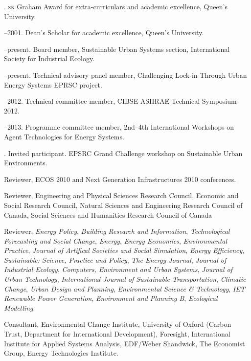 \documentclass[11pt,a4paper]{article}
\begin{document}
.  \textsc{sn} Graham Award for extra-curriculars and academic excellence, Queen's University.

--2001.  Dean's Scholar for academic excellence, Queen's University.

\bigskip 

\noindent{}%
%
--present. Board member, Sustainable Urban Systems section, International Society for Industrial Ecology.

--present. Technical advisory panel member, Challenging Lock-in Through Urban Energy Systems EPRSC project.

--2012. Technical committee member, CIBSE ASHRAE Technical Symposium 2012.

--2013. Programme committee member, 2nd--4th International Workshops on Agent Technologies for Energy Systems.

. Invited participant.  EPSRC Grand Challenge workshop on Sustainable Urban Environments.

\ind Reviewer, ECOS 2010 and Next Generation Infrastructures 2010 conferences.

\ind Reviewer, Engineering and Physical Sciences Research Council, Economic and Social Research Council, Natural Sciences and Engineering Research Council of Canada, Social Sciences and Humanities Research Council of Canada

\ind Reviewer, \emph{Energy Policy}, \emph{Building Research and Information}, \emph{Technological Forecasting and Social Change}, \emph{Energy}, \emph{Energy Economics}, \emph{Environmental Practice}, \emph{Journal of Artifical Societies and Social Simulation}, \emph{Energy Efficiency}, \emph{Sustainable: Science, Practice and Policy}, \emph{The Energy Journal}, \emph{Journal of Industrial Ecology}, \emph{Computers, Environment and Urban Systems}, \emph{Journal of Urban Technology}, \emph{International Journal of Sustainable Transportation}, \emph{Climatic Change}, \emph{Urban Design and Planning}, \emph{Environmental Science \& Technology}, \emph{IET Renewable Power Generation}, \emph{Environment and Planning B}, \emph{Ecological Modelling}.

\ind Consultant, Environmental Change Institute, University of Oxford (Carbon Trust, Department for International Development), Foresight, International Institute for Applied Systems Analysis, EDF/Weber Shandwick, The Economist Group, Energy Technologies Institute.
\bigskip%
\end{document}

